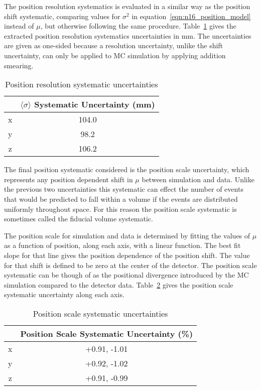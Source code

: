 The position resolution systematics is evaluated in a similar way as the position
shift systematic, comparing values for
$\sigma^{2}$ in equation~\eqref{eqn:n16_position_model} instead of $\mu$,
but otherwise following the same procedure.
Table~\ref{tbl:position_resolution_systs} gives the extracted position resolution systematics uncertainties
in $\text{mm}$. The uncertainties are given as one-sided because a resolution uncertainty,
unlike the shift uncertainty,
can only be applied to MC simulation by applying addition smearing.
\begin{table}
    \centering
    \begin{tabular}{|c|c|}
            \hline
            &$\langle \sigma \rangle$ Systematic Uncertainty (mm)\\
            \hline
            x&104.0\\
            y&98.2\\
            z&106.2\\
            \hline
    \end{tabular}
    \caption{Position resolution systematic uncertainties}
    \label{tbl:position_resolution_systs}
\end{table}


The final position systematic considered is the position scale uncertainty,
which represents any position dependent shift in $\mu$ between simulation
and data. Unlike the previous two uncertainties this systematic can effect the
number of events that would be predicted to fall within a volume if the
events are distributed uniformly throughout space. For this reason the position
scale systematic is sometimes called the fiducial volume systematic.

The position scale for simulation and data is determined by fitting the values
of $\mu$ as a function of position, along each axis, with a linear function.
The best fit slope for that line gives the position dependence of the position
shift. The value for that shift is defined to be zero at the center
of the detector. The position scale systematic can be though of as the
positional divergence introduced by the MC simulation compared to the detector
data. Table~\ref{tbl:position_scale_systs} gives the position scale systematic
uncertainty along each axis.

\begin{table}
    \centering
    \begin{tabular}{|c|c|}
            \hline
            &Position Scale Systematic Uncertainty (\%)\\
            \hline
            x&+0.91, -1.01\\
            y&+0.92, -1.02\\
            z&+0.91, -0.99\\
            \hline
    \end{tabular}
    \caption{Position scale systematic uncertainties}
    \label{tbl:position_scale_systs}
\end{table}

